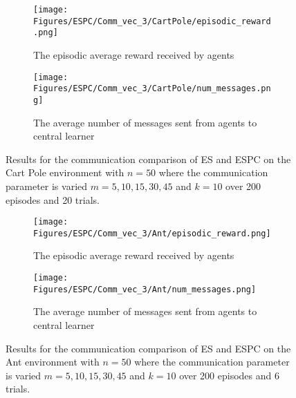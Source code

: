 \begin{figure}[H]
    \centering
    \begin{subfigure}{0.4\textwidth}
        \centering
        \texttt{[image: Figures/ESPC/Comm\_vec\_3/CartPole/episodic\_reward.png]}
        \caption{The episodic average reward received by agents}
        \label{fig:CommEpisodicReward}
    \end{subfigure}
    \begin{subfigure}{0.4\textwidth}
        \centering
        \texttt{[image: Figures/ESPC/Comm\_vec\_3/CartPole/num\_messages.png]}
        \caption{The average number of messages sent from agents to central learner}
        \label{fig:CommMessages}
    \end{subfigure}
    \caption{Results for the communication comparison of ES and ESPC on the Cart Pole environment with $n=50$ where the communication parameter is varied $m=5,10,15,30,45$ and $k=10$ over 200 episodes and 20 trials.}
    \label{fig:CPComm}
\end{figure}
\begin{figure}[H]
    \centering
    \begin{subfigure}{0.4\textwidth}
        \centering
        \texttt{[image: Figures/ESPC/Comm\_vec\_3/Ant/episodic\_reward.png]}
        \caption{The episodic average reward received by agents}
        \label{fig:AntCommEpisodicReward}
    \end{subfigure}
    \begin{subfigure}{0.4\textwidth}
        \centering
        \texttt{[image: Figures/ESPC/Comm\_vec\_3/Ant/num\_messages.png]}
        \caption{The average number of messages sent from agents to central learner}
        \label{fig:AntCommMessages}
    \end{subfigure}
    \caption{Results for the communication comparison of ES and ESPC on the Ant environment with $n=50$ where the communication parameter is varied $m=5,10,15,30,45$ and $k=10$ over 200 episodes and 6 trials.}
    \label{fig:AntComm}
\end{figure}



